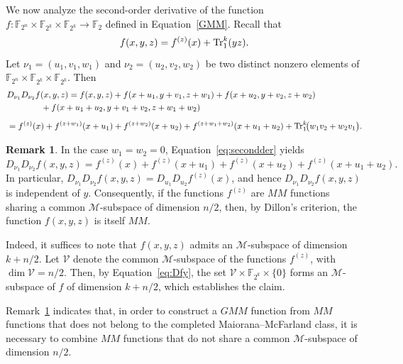 \documentclass[12pt]{article}
\theoremstyle{plain}
\theoremstyle{definition}
\newtheorem{remark}{Remark}
\renewcommand{\to}{\rightarrow}
\newcommand{\Tr}{{\rm Tr}}
\begin{document}
	We now analyze the second-order derivative of the function
	\(f : \mathbb{F}_{2^n} \times \mathbb{F}_{2^k} \times \mathbb{F}_{2^k}
	\to \mathbb{F}_2\) defined in Equation~\eqref{GMM}.
	Recall that
	\[
	f(x,y,z) = f^{(z)}(x) + \Tr_1^k(yz).
	\]
	Let
	\(\nu_1 = (u_1,v_1,w_1)\) and
	\(\nu_2 = (u_2,v_2,w_2)\)
	be two distinct nonzero elements of
	\(\mathbb{F}_{2^n} \times \mathbb{F}_{2^k} \times \mathbb{F}_{2^k}\). Then
	\begin{align}\label{eq:secondder}
		&D_{\nu_1}D_{\nu_2}f(x,y,z)
		= f(x,y,z)
		+ f(x+u_1,y+v_1,z+w_1)
		+ f(x+u_2,y+v_2,z+w_2)\\ \nonumber
		&\qquad\qquad 
		+ f(x+u_1+u_2,y+v_1+v_2,z+w_1+w_2)\\[0.5em] \nonumber
		&=f^{(z)}(x)
		+ f^{(z+w_1)}(x+u_1)
		+f^{(z+w_2)}(x+u_2)
		+ f^{(z+w_1+w_2)}(x+u_1+u_2)
		+ \Tr_1^k\!\bigl(w_1v_2+w_2v_1\bigr).
	\end{align}
	
	\begin{remark}\label{rem:Msub}
		In the case \(w_1 = w_2 = 0\), Equation~\eqref{eq:secondder} yields
		\begin{equation}\label{eq:Dfy}
			D_{\nu_1} D_{\nu_2} f(x,y,z)
			=
			f^{(z)}(x)
			+ f^{(z)}(x+u_1)
			+ f^{(z)}(x+u_2)
			+ f^{(z)}(x+u_1+u_2).
		\end{equation}
		In particular, $D_{\nu_1} D_{\nu_2} f(x,y,z)
		=
		D_{u_1} D_{u_2} f^{(z)}(x)$,
		and hence \(D_{\nu_1} D_{\nu_2} f(x,y,z)\) is independent of \(y\).
		Consequently, if the functions \(f^{(z)}\) are \(MM\) functions
		sharing a common \(\mathcal{M}\)-subspace of dimension \(n/2\), then, by
		Dillon's criterion, the function \(f(x,y,z)\) is itself \(MM\). 
				
		Indeed, it suffices to note that \(f(x,y,z)\) admits an \(\mathcal{M}\)-subspace
		of dimension \(k + n/2\).
		Let \(\mathcal{V}\) denote the common \(\mathcal{M}\)-subspace of the functions
		\(f^{(z)}\), with \(\dim \mathcal{V} = n/2\).
		Then, by Equation~\eqref{eq:Dfy}, the set $\mathcal{V}  \times \mathbb{F}_{2^k} \times \{0\}$
		forms an \(\mathcal{M}\)-subspace of \(f\) of dimension \(k + n/2\), which
		establishes the claim.
	\end{remark}
	
	Remark~\ref{rem:Msub} indicates that, in order to construct a \(GMM\) function from \(MM\) functions that does
	not belong to the completed Maiorana--McFarland class, it is necessary to
	combine \(MM\) functions that do not share a common \(\mathcal{M}\)-subspace of
	dimension \(n/2\).
	
\end{document}
